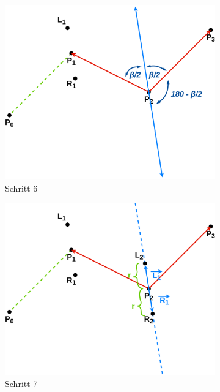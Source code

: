 \documentclass[doktyp=studarbeit]{TUBAFarbeiten}
\begin{document}
\begin{figure}[!htb]
\begin{subfigure}[b]{0.35\textwidth}
        \includegraphics[width=1\linewidth]{Schlangenlinie-6.png}
        \caption{Schritt 6}
    \end{subfigure}
    \qquad
    \begin{subfigure}[b]{0.35\textwidth}
        \centering
        \includegraphics[width=1\linewidth]{Schlangenlinie-7.png}
        \caption{Schritt 7}
    \end{subfigure}
    \qquad
    \begin{subfigure}[b]{0.35\textwidth}
        \centering

\end{subfigure}
\end{figure}
\end{document}
